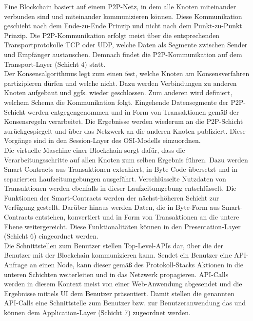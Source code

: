 Eine Blockchain basiert auf einem \ac{P2P}-Netz, in dem alle Knoten miteinander verbunden sind und miteinander kommunizieren können. Diese Kommunikation geschieht nach dem Ende-zu-Ende Prinzip und nicht nach dem Punkt-zu-Punkt Prinzip. Die \ac{P2P}-Kommunikation erfolgt meist über die entsprechenden Transportprotokolle TCP oder UDP, welche Daten als Segmente zwischen Sender und Empfänger austauschen. Demnach findet die \ac{P2P}-Kommunikation auf dem Transport-Layer (Schicht 4) statt.\\
Der Konsensalgorithmus legt zum einen fest, welche Knoten am Konsensverfahren partizipieren dürfen und welche nicht. Dazu werden Verbindungen zu anderen Knoten aufgebaut und ggfs. wieder geschlossen. Zum anderen wird definiert, welchem Schema die Kommunikation folgt. Eingehende Datensegmente der \ac{P2P}-Schicht werden entgegengenommen und in Form von Transaktionen gemäß der Konsensregeln verarbeitet. Die Ergebnisse werden wiederum an die \ac{P2P}-Schicht zurückgespiegelt und über das Netzwerk an die anderen Knoten publiziert. Diese Vorgänge sind in den Session-Layer des \ac{OSI}-Modells einzuordnen.\\
Die virtuelle Maschine einer Blockchain sorgt dafür, dass die Verarbeitungsschritte auf allen Knoten zum selben Ergebnis führen. Dazu werden Smart-Contracts aus Transaktionen extrahiert, in Byte-Code übersetzt und in separierten Laufzeitumgebungen ausgeführt. Verschlüsselte Nutzdaten von Transaktionen werden ebenfalls in dieser Laufzeitumgebung entschlüsselt. Die Funktionen der Smart-Contracts werden der nächst-höheren Schicht zur Verfügung gestellt. Darüber hinaus werden Daten, die in Byte-Form aus Smart-Contracts entstehen, konvertiert und in Form von Transaktionen an die untere Ebene weitergereicht. Diese Funktionalitäten können in den Presentation-Layer (Schicht 6) eingeordnet werden.\\
Die Schnittstellen zum Benutzer stellen Top-Level-\ac{API}s dar, über die der Benutzer mit der Blockchain kommunizieren kann. Sendet ein Benutzer eine API-Anfrage an einen Node, kann dieser gemäß des Protokoll-Stacks Aktionen in die unteren Schichten weiterleiten und in das Netzwerk propagieren. API-Calls werden in diesem Kontext meist von einer Web-Anwendung abgesendet und die Ergebnisse mittels \ac{UI} dem Benutzer präsentiert. Damit stellen die genannten API-Calls eine Schnittstelle zum Benutzer bzw. zur Benutzeranwendung das und können dem Application-Layer (Schicht 7) zugeordnet werden.\\

